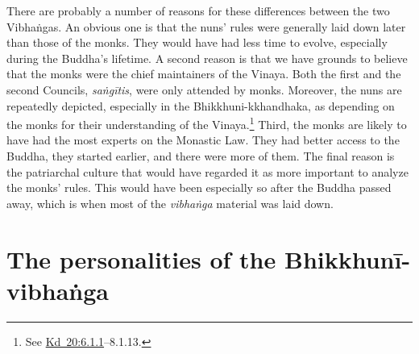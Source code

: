 \documentclass[12pt,openany]{book}%
\begin{document}
There are probably a number of reasons for these differences between the two \textsanskrit{Vibhaṅgas}. An obvious one is that the nuns’ rules were generally laid down later than those of the monks. They would have had less time to evolve, especially during the Buddha’s lifetime. A second reason is that we have grounds to believe that the monks were the chief maintainers of the Vinaya. Both the first and the second Councils, \textit{\textsanskrit{saṅgītis}}, were only attended by monks. Moreover, the nuns are repeatedly depicted, especially in the Bhikkhuni-kkhandhaka, as depending on the monks for their understanding of the Vinaya.\footnote{See \href{https://suttacentral.net/pli-tv-kd20/en/brahmali\#6.1.1}{Kd~20:6.1.1}–8.1.13. } Third, the monks are likely to have had the most experts on the Monastic Law. They had better access to the Buddha, they started earlier, and there were more of them. The final reason is the patriarchal culture that would have regarded it as more important to analyze the monks’ rules. This would have been especially so after the Buddha passed away, which is when most of the \textit{\textsanskrit{vibhaṅga}} material was laid down.

\section*{The personalities of the \textsanskrit{Bhikkhunī}-\textsanskrit{vibhaṅga}}
\end{document}
